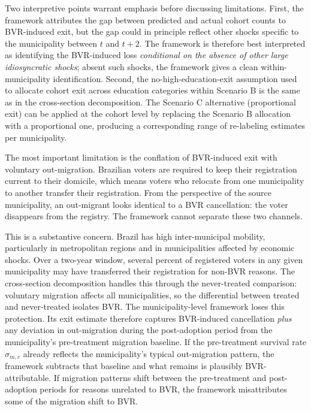 Two interpretive points warrant emphasis before discussing limitations. First, the framework attributes the gap between predicted and actual cohort counts to BVR-induced exit, but the gap could in principle reflect other shocks specific to the municipality between $t$ and $t+2$. The framework is therefore best interpreted as identifying the BVR-induced loss \emph{conditional on the absence of other large idiosyncratic shocks}; absent such shocks, the framework gives a clean within-municipality identification. Second, the no-high-education-exit assumption used to allocate cohort exit across education categories within Scenario B is the same as in the cross-section decomposition. The Scenario C alternative (proportional exit) can be applied at the cohort level by replacing the Scenario B allocation with a proportional one, producing a corresponding range of re-labeling estimates per municipality.

The most important limitation is the conflation of BVR-induced exit with voluntary out-migration. Brazilian voters are required to keep their registration current to their domicile, which means voters who relocate from one municipality to another transfer their registration. From the perspective of the source municipality, an out-migrant looks identical to a BVR cancellation: the voter disappears from the registry. The framework cannot separate these two channels.

This is a substantive concern. Brazil has high inter-municipal mobility, particularly in metropolitan regions and in municipalities affected by economic shocks. Over a two-year window, several percent of registered voters in any given municipality may have transferred their registration for non-BVR reasons. The cross-section decomposition handles this through the never-treated comparison: voluntary migration affects all municipalities, so the differential between treated and never-treated isolates BVR. The municipality-level framework loses this protection. Its exit estimate therefore captures BVR-induced cancellation \emph{plus} any deviation in out-migration during the post-adoption period from the municipality's pre-treatment migration baseline. If the pre-treatment survival rate $\hat\sigma_{m,c}$ already reflects the municipality's typical out-migration pattern, the framework subtracts that baseline and what remains is plausibly BVR-attributable. If migration patterns shift between the pre-treatment and post-adoption periods for reasons unrelated to BVR, the framework misattributes some of the migration shift to BVR.

